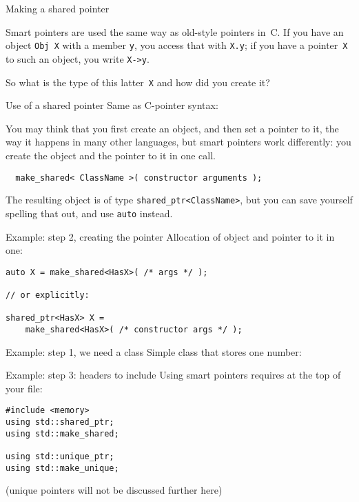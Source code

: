  {Making a shared pointer}
\label{sec:shared_ptr}

Smart pointers are used the same way as old-style pointers in~C.
If you have an
object \lstinline{Obj X} with a member \lstinline{y}, you access that with \lstinline{X.y}; if you
have a pointer~\lstinline{X} to such an object, you write \lstinline{X->y}.

So what is the type of this latter~\lstinline{X} and how did you create it?

\begin{block}{Use of a shared pointer}
  \label{sl:use-shared}
Same as C-pointer syntax:
\end{block}

You may think that you first create an object, and then set a pointer to it,
the way it happens in many other languages, but smart pointers work differently:
you create the object and the pointer to it in one call.
\begin{lstlisting}
  make_shared< ClassName >( constructor arguments );
\end{lstlisting}
The resulting object is of type \lstinline+shared_ptr<ClassName>+,
but you can save yourself spelling that out, and use \lstinline{auto}
instead.

\begin{block}{Example: step 2, creating the pointer}
  \label{sl:make-shared}
  Allocation of object and pointer to it in one:
\begin{lstlisting}
auto X = make_shared<HasX>( /* args */ );

// or explicitly:

shared_ptr<HasX> X =
    make_shared<HasX>( /* constructor args */ );
\end{lstlisting}
\end{block}

\begin{block}{Example: step 1, we need a class}
  \label{sl:shared-ptr}
  Simple class that stores one number:
\end{block}

\begin{block}{Example: step 3: headers to include}
  \label{sl:pointer-header}
  Using smart pointers requires at the top of your file:
\begin{lstlisting}
#include <memory>
using std::shared_ptr;
using std::make_shared;

using std::unique_ptr;
using std::make_unique;
\end{lstlisting}
(unique pointers will not be discussed further here)
\end{block}

